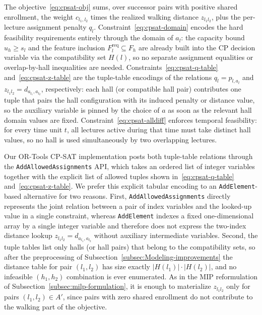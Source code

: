 \documentclass[11pt]{article}
\begin{document}
The objective~\eqref{eq:cpsat-obj} sums, over successor pairs with positive shared enrollment, the weight $c_{l_1,l_2}$ times the realized walking distance $z_{l_1 l_2}$, plus the per-lecture assignment penalty $q_l$. Constraint~\eqref{eq:cpsat-domain} encodes the hard feasibility requirements entirely through the domain of $a_l$: the capacity bound $u_h \ge s_l$ and the feature inclusion $F_l^{\mathrm{req}} \subseteq F_h$ are already built into the CP decision variable via the compatibility set $H(l)$, so no separate assignment equalities or overlap-by-hall inequalities are needed. Constraints~\eqref{eq:cpsat-q-table} and~\eqref{eq:cpsat-z-table} are the tuple-table encodings of the relations $q_l = p_{l, a_l}$ and $z_{l_1 l_2} = d_{a_{l_1}, a_{l_2}}$, respectively: each hall (or compatible hall pair) contributes one tuple that pairs the hall configuration with its induced penalty or distance value, so the auxiliary variable is pinned by the choice of $a$ as soon as the relevant hall domain values are fixed. Constraint~\eqref{eq:cpsat-alldiff} enforces temporal feasibility: for every time unit $t$, all lectures active during that time must take distinct hall values, so no hall is used simultaneously by two overlapping lectures.

Our OR-Tools CP-SAT implementation posts both tuple-table relations through the \texttt{AddAllowed\-Assignments} API, which takes an ordered list of integer variables together with the explicit list of allowed tuples shown in~\eqref{eq:cpsat-q-table} and~\eqref{eq:cpsat-z-table}. We prefer this explicit tabular encoding to an \texttt{AddElement}-based alternative for two reasons. First, \texttt{AddAllowed\-Assignments} directly represents the joint relation between a pair of index variables and the looked-up value in a single constraint, whereas \texttt{AddElement} indexes a fixed one-dimensional array by a single integer variable and therefore does not express the two-index distance lookup $z_{l_1 l_2} = d_{a_{l_1},a_{l_2}}$ without auxiliary intermediate variables. Second, the tuple tables list only halls (or hall pairs) that belong to the compatibility sets, so after the preprocessing of Subsection~\ref{subsec:Modeling-improvements} the distance table for pair $(l_1,l_2)$ has size exactly $|H(l_1)|\cdot|H(l_2)|$, and no infeasible $(h_1,h_2)$ combination is ever enumerated. As in the MIP reformulation of Subsection~\ref{subsec:milp-formulation}, it is enough to materialize $z_{l_1 l_2}$ only for pairs $(l_1,l_2) \in A'$, since pairs with zero shared enrollment do not contribute to the walking part of the objective.
\end{document}

